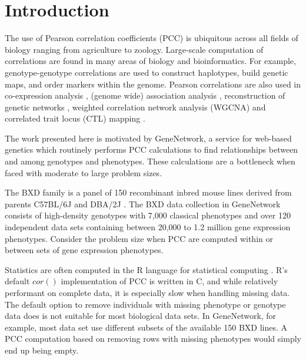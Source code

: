 \documentclass{bioinfo}
\begin{document}
\maketitle


\section{Introduction}

The use of Pearson correlation coefficients (PCC) is ubiquitous across all 
fields of biology ranging from agriculture to zoology. Large-scale 
computation of correlations are found in many areas of biology and 
bioinformatics.  For example, genotype-genotype correlations are 
used to construct haplotypes, build genetic maps, and order markers 
within the genome. Pearson correlations are also used in 
co-expression analysis \citep{Tesson:2010}, (genome wide) 
association analysis \citep{Cichonska:2016}, reconstruction of genetic
networks \citep{Fukushima:2013}, weighted correlation network analysis
(WGCNA) \citep{Horvath:2008} and correlated trait locus (CTL)
mapping \citep{Arends2016a}.

\enlargethispage{12pt}

The work presented here is motivated by GeneNetwork, a service for
web-based genetics \citep{Sloan2016} which routinely performs PCC 
calculations to find relationships between and among genotypes and 
phenotypes. These calculations are a bottleneck when faced with 
moderate to large problem sizes.

The BXD family is a panel of 150 recombinant inbred mouse lines
derived from parents C57BL/6J and DBA/2J \citep{Ashbrook:2019}. The
BXD data collection in GeneNetwork consists of high-density genotypes
with 7,000 classical phenotypes and over 120 independent data sets containing
between 20,000 to 1.2 million gene expression phenotypes. Consider 
the problem size when PCC are computed within or between sets 
of gene expression phenotypes. 

Statistics are often computed in the R language for statistical computing 
\citep{R:2005}. R's default $cor()$ implementation of PCC is written in C, 
and while relatively performant on complete data, it is especially slow 
when handling missing data. The default option to remove individuals with 
missing phenotype or genotype data does is not suitable for most biological 
data sets. In GeneNetwork, for example, most data set use different subsets 
of the available 150 BXD lines. A PCC computation based on removing rows with 
missing phenotypes would simply end up being empty. 
\end{document}
